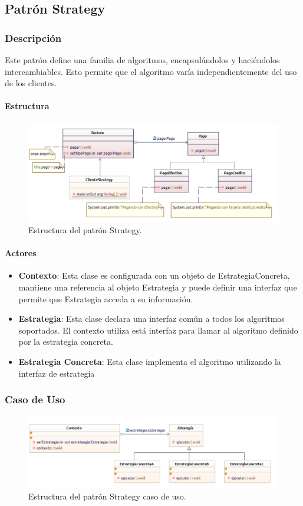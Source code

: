 \subsection{Patrón Strategy}

\subsubsection{Descripción}
Este patrón define una familia de algoritmos, encapsulándolos y haciéndolos intercambiables. Esto permite que el algoritmo varía independientemente del uso de los clientes.
\paragraph{Estructura}

\begin{figure}[th!]
	\centering
	\includegraphics[width=.7\linewidth]{imagenes/Patrones/Strategy.pdf}
	\caption{Estructura del patrón Strategy.\cite{gof}}	
\end{figure}

\paragraph{Actores}

\begin{itemize}
	\item \textbf{Contexto}: Esta clase es configurada con un objeto de EstrategiaConcreta, mantiene una referencia al objeto Estrategia y puede definir una interfaz que permite que Estrategia acceda a su información.
	\item \textbf{Estrategia}: Esta clase declara una interfaz común a todos los algoritmos soportados. El contexto utiliza está interfaz para llamar al algoritmo definido por la estrategia concreta.
	\item \textbf{Estrategia Concreta}: Esta clase implementa el algoritmo utilizando la interfaz de estrategia
\end{itemize}


\subsubsection{Caso de Uso}
\begin{figure}[th!]
	\centering
	\includegraphics[width=.7\linewidth]{imagenes/Patrones/Strategy_caso.pdf}
	\caption{Estructura del patrón Strategy caso de uso.\cite{gof}}	
\end{figure}

